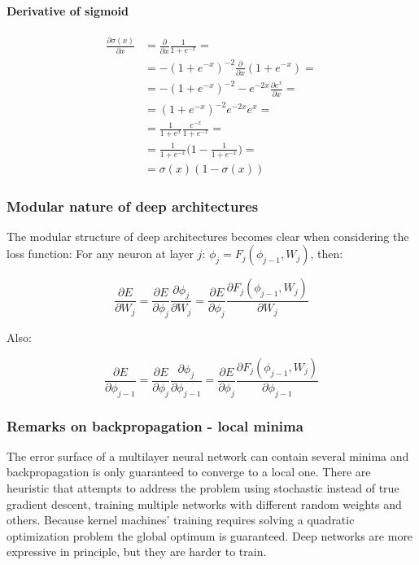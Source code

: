 			\paragraph{Derivative of sigmoid}

			\begin{align*}
				\frac{\partial\sigma(x)}{\partial x} &= \frac{\partial}{\partial x}\frac{1}{1+e^{-x}}=\\
								     &=-(1+e^{-x})^{-2}\frac{\partial}{\partial x}(1+e^{-x})=\\
								     &=-(1+e^{-x})^{-2}-e^{-2x}\frac{\partial e^x}{\partial x}=\\
								     &=(1+e^{-x})^{-2}e^{-2x}e^x=\\
								     &=\frac{1}{1+e^x}\frac{e^{-x}}{1+e^{-x}}=\\
								     &=\frac{1}{1+e^{-x}}\biggl(1-\frac{1}{1+e^{-x}}\biggr)=\\
								     &=\sigma(x)(1-\sigma(x))
			\end{align*}

		\subsubsection{Modular nature of deep architectures}
		The modular structure of deep architectures becomes clear when considering the loss function:
		For any neuron at layer $j$: $\phi_j = F_j(\phi_{j-1},W_j)$, then:

		$$\frac{\partial E}{\partial W_j} = \frac{\partial E}{\partial\phi_j}\frac{\partial\phi_j}{\partial W_j} = \frac{\partial E}{\partial \phi_j}\frac{\partial F_j(\phi_{j-1},W_j)}{\partial W_j}$$

		Also:

		$$\frac{\partial E}{\partial\phi_{j-1}} = \frac{\partial E}{\partial \phi_j}\frac{\partial \phi_j}{\partial\phi_{j-1}} = \frac{\partial E}{\partial \phi_j}\frac{\partial F_j(\phi_{j-1},W_j)}{\partial\phi_{j-1}}$$

		\subsubsection{Remarks on backpropagation - local minima}
		The error surface of a multilayer neural network can contain several minima and backpropagation is only guaranteed to converge to a local one.
		There are heuristic that attempts to address the problem using stochastic instead of true gradient descent, training multiple networks with different random weights and others.
		Because kernel machines' training requires solving a quadratic optimization problem the global optimum is guaranteed.
		Deep networks are more expressive in principle, but they are harder to train.

